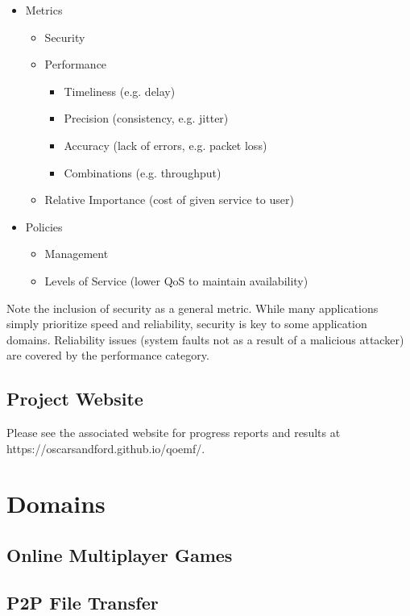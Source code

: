 \documentclass{article}
\begin{document}
\begin{itemize}
    \item Metrics
    \begin{itemize}
        \item Security
        \item Performance
        \begin{itemize}
            \item Timeliness (e.g. delay)
            \item Precision (consistency, e.g. jitter)
            \item Accuracy (lack of errors, e.g. packet loss)
            \item Combinations (e.g. throughput)
        \end{itemize}
        \item Relative Importance (cost of given service to user)
    \end{itemize}
    \item Policies
    \begin{itemize}
        \item Management
        \item Levels of Service (lower QoS to maintain availability)
    \end{itemize}
\end{itemize}

Note the inclusion of security as a general metric. While many applications simply prioritize speed and reliability, security is key to some application domains. 
Reliability issues (system faults not as a result of a malicious attacker) are covered by the performance category. 


\subsection{Project Website}
Please see the associated website for progress reports and results at https://oscarsandford.github.io/qoemf/.

\section{Domains}

\subsection{Online Multiplayer Games}

\subsection{P2P File Transfer}
\end{document}
